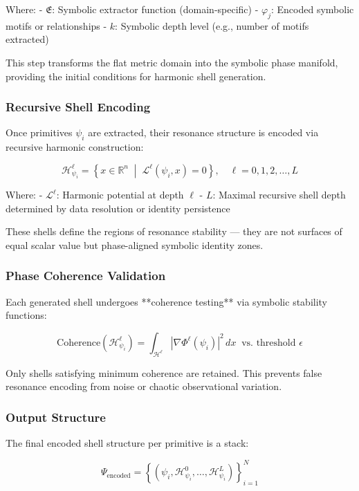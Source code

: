 \documentclass[12pt]{article}
\begin{document}
Where:
- \( \mathfrak{E} \): Symbolic extractor function (domain-specific)
- \( \varphi_j \): Encoded symbolic motifs or relationships
- \( k \): Symbolic depth level (e.g., number of motifs extracted)

This step transforms the flat metric domain into the symbolic phase manifold, providing the initial conditions for harmonic shell generation.

\subsubsection{Recursive Shell Encoding}

Once primitives \( \psi_i \) are extracted, their resonance structure is encoded via recursive harmonic construction:

\[
\mathcal{H}_{\psi_i}^\ell = \left\{ x \in \mathbb{R}^n \;\middle|\; \mathcal{L}^\ell(\psi_i, x) = 0 \right\}, \quad \ell = 0, 1, 2, \dots, L
\]

Where:
- \( \mathcal{L}^\ell \): Harmonic potential at depth \( \ell \)
- \( L \): Maximal recursive shell depth determined by data resolution or identity persistence

These shells define the regions of resonance stability — they are not surfaces of equal scalar value but phase-aligned symbolic identity zones.

\subsubsection{Phase Coherence Validation}

Each generated shell undergoes **coherence testing** via symbolic stability functions:

\[
\text{Coherence}(\mathcal{H}^\ell_{\psi_i}) = \int_{\mathcal{H}^\ell} \left| \nabla \Phi^\ell(\psi_i) \right|^2 \, dx \;\; \text{vs. threshold } \epsilon
\]

Only shells satisfying minimum coherence are retained. This prevents false resonance encoding from noise or chaotic observational variation.

\subsubsection{Output Structure}

The final encoded shell structure per primitive is a stack:

\[
\Psi_{\text{encoded}} = \left\{ \left(\psi_i, \mathcal{H}_{\psi_i}^0, \dots, \mathcal{H}_{\psi_i}^L \right) \right\}_{i=1}^N
\]
\end{document}
